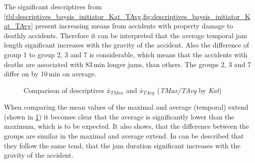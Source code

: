 The significant descriptives from \cref{tbl:descriptives_baysis_initiator_Kat_TAvg,fig:descriptives_baysis_initiator_Kat_TAvg} present increasing means from accidents with property damage to deathly accidents. Therefore it can be interpreted that the average temporal jam length significant increases with the gravity of the accident. Also the difference of group 1 to group 2, 3 and 7 is considerable, which means that the accidents with deaths are associated with 83\,min longer jams, than others. The groups 2, 3 and 7 differ on by 10\,min on average. 
\begin{figure}[ht!]
	\data
    \pgfplotstablesort[sort key=meanTAvg, sort cmp=float >]{\datasorted}{\data}
    \tiny
    \centering
	\caption{Comparison of descriptives $\bar{x}_{TMax}$ and $\bar{x}_{TAvg}$ (\textit{TMax/TAvg} by \textit{Kat})}
	\label{fig:baysis_initiator_meancomparison_Kat_temporal}
\end{figure}
When comparing the mean values of the maximal and average (temporal) extend (shown in \cref{fig:baysis_initiator_meancomparison_Kat_temporal}) it becomes clear that the average is significantly lower than the maximum, which is to be expected. It also shows, that the difference between the groups are similar in the maximal and average extend. In can be described that they follow the same tend, that the jam duration significant increases with the gravity of the accident.

 

